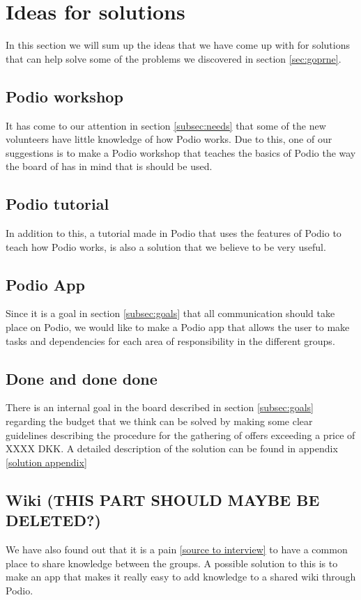 \section{Ideas for solutions}
In this section we will sum up the ideas that we have come up with for solutions
that can help solve some of the problems we discovered in section \ref{sec:goprne}.

\subsection{Podio workshop}
It has come to our attention in section \ref{subsec:needs} that
some of the new volunteers have little knowledge of how Podio works. Due to
this, one of our suggestions is to make a Podio workshop that teaches the basics
of Podio the way the board of \mil has in mind that is should be used.

\subsection{Podio tutorial}
In addition to this, a tutorial made in Podio that uses the features of Podio to
teach how Podio works, is also a solution that we believe to be very useful.

\subsection{Podio App}
Since it is a goal in section \ref{subsec:goals} that all communication should take place
on Podio, we would like to make a Podio app that allows the user to make tasks
and dependencies for each area of responsibility in the different groups.

\subsection{Done and done done}
There is an internal goal in the board described in section \ref{subsec:goals} regarding the
budget that we think can be solved by making some clear guidelines describing
the procedure for the gathering of offers exceeding a price of XXXX DKK. A
detailed description of the solution can be found in appendix \ref{solution
appendix}

\subsection{Wiki (THIS PART SHOULD MAYBE BE DELETED?)}
We have also found out that it is a pain \ref{source to interview} to have a
common place to share knowledge between the groups. A possible solution to this
is to make an app that makes it really easy to add knowledge to a shared wiki
through Podio.

